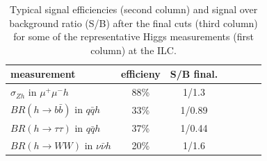 

\begin{table}
\begin{center}
\begin{tabular} {lcccccc}
measurement  & efficieny &  S/B final. \\
\hline
$\sigma_{Zh}$ in $\mu^+\mu^-h$  & 88\% & 1/1.3 \\
$BR(h\to b\bar{b})$ in $q\bar{q}h$ & 33\% & 1/0.89 \\
$BR(h\to\tau\tau)$ in $q\bar{q}h$ & 37\% &  1/0.44 \\
$BR(h\to WW)$ in $\nu\bar{\nu}h$ & 20\% &  1/1.6
\end{tabular}
\caption{Typical signal efficiencies (second column) and signal over background ratio (S/B) 
after the final cuts (third column) for some of the 
representative Higgs measurements (first column) at the ILC.}
\label{tab:ILCEffSB}
\end{center}
\end{table}


